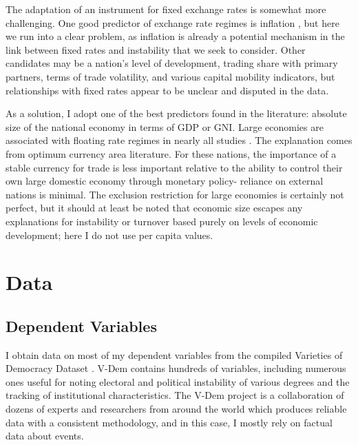 \documentclass{article}
\begin{document}
    The adaptation of an instrument for fixed exchange rates is somewhat more challenging. One good predictor of exchange rate regimes is inflation \citep{mauro_long-run_2002}, but here we run into a clear problem, as inflation is already a potential mechanism in the link between fixed rates and instability that we seek to consider. Other candidates may be a nation’s level of development, trading share with primary partners, terms of trade volatility, and various capital mobility indicators, but relationships with fixed rates appear to be unclear and disputed in the data. 

    As a solution, I adopt one of the best predictors found in the literature: absolute size of the national economy in terms of GDP or GNI. Large economies are associated with floating rate regimes in nearly all studies \citep{mauro_long-run_2002}. The explanation comes from optimum currency area literature. For these nations, the importance of a stable currency for trade is less important relative to the ability to control their own large domestic economy through monetary policy- reliance on external nations is minimal. The exclusion restriction for large economies is certainly not perfect, but it should at least be noted that economic size escapes any explanations for instability or turnover based purely on levels of economic development; here I do not use per capita values.

    \section*{Data}

    \subsection*{Dependent Variables}

    I obtain data on most of my dependent variables from the compiled Varieties of Democracy Dataset \citep{michael_coppedge_v-dem_2020}. V-Dem contains hundreds of variables, including numerous ones useful for noting electoral and political instability of various degrees and the tracking of institutional characteristics. The V-Dem project is a collaboration of dozens of experts and researchers from around the world which produces reliable data with a consistent methodology, and in this case, I mostly rely on factual data about events.
\end{document}
